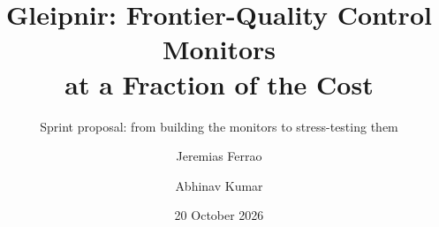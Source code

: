 \documentclass[aspectratio=169,11pt,usepdftitle=false]{beamer}
\title[Gleipnir Sprint]{Gleipnir: Frontier-Quality Control Monitors\\at a Fraction of the Cost}
\subtitle{Sprint proposal: from building the monitors to stress-testing them}
\author[Ferrao \& Kumar]{Jeremias Ferrao \and Abhinav Kumar}
\date{20 October 2026}
\begin{document}
\begin{frame}[plain]
    \titlepage
\end{frame}


\end{document}
